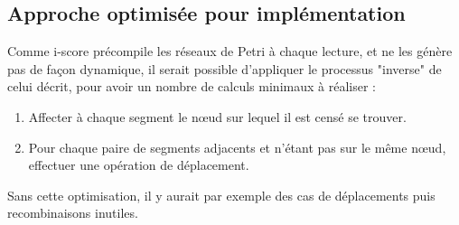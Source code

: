\subsection{Approche optimisée pour implémentation}
Comme i-score précompile les réseaux de Petri à chaque lecture, et ne les génère pas de façon dynamique, il serait possible d'appliquer le processus "inverse" de celui décrit, pour avoir un nombre de calculs minimaux à réaliser : 

\begin{enumerate}
\item Affecter à chaque segment le nœud sur lequel il est censé se trouver.
\item Pour chaque paire de segments adjacents et n'étant pas sur le même nœud, effectuer une opération de déplacement.
\end{enumerate}

Sans cette optimisation, il y aurait par exemple des cas de déplacements puis recombinaisons inutiles.